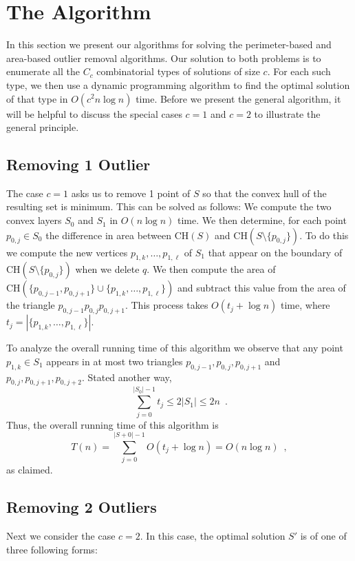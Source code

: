 \documentclass[lotsofwhite]{patmorin}
\newcommand{\ch}{\mathrm{CH}}
\begin{document}
\section{The Algorithm}

In this section we present our algorithms for solving the
perimeter-based and area-based outlier removal algorithms. Our
solution to both problems is to enumerate all the $C_c$ combinatorial
types of solutions of size $c$.  For each such type, we then use a
dynamic programming algorithm to find the optimal solution of that
type in $O(c^2 n\log n)$ time.  Before we present the general
algorithm, it will be helpful to discuss the special cases $c=1$ and
$c=2$ to illustrate the general principle.

\subsection{Removing 1 Outlier}

The case $c=1$ asks us to remove 1 point of $S$ so that the convex
hull of the resulting set is minimum.  This can be solved as follows:
We compute the two convex layers $S_0$ and $S_1$ in $O(n\log n)$ time.
We then determine, for each point $p_{0,j}\in S_0$ the difference in
area between $\ch(S)$ and $\ch(S\setminus\{p_{0,j}\})$.  To do this we
compute the new vertices $p_{1,k},\ldots,p_{1,\ell}$ of $S_1$ that
appear on the boundary of $\ch(S\setminus\{p_{0,j}\})$ when we delete
$q$.  We then compute the area of
$\ch(\{p_{0,j-1},p_{0,j+1}\}\cup\{p_{1,k},\ldots,p_{1,\ell}\})$ and
subtract this value from the area of the triangle
$p_{0,j-1}p_{0,j}p_{0,j+1}$.   This
process takes $O(t_j+\log n)$ time, where
$t_j=|\{p_{1,k},\ldots,p_{1,\ell}\}|$.

To analyze the overall running time of this algorithm we observe that
any point $p_{1,k}\in S_1$ appears in at most two triangles
$p_{0,j-1},p_{0,j},p_{0,j+1}$ and 
$p_{0,j},p_{0,j+1},p_{0,j+2}$.  Stated another way, 
\[  
     \sum_{j=0}^{|S_0|-1} t_j \le 2|S_1|\le 2n \enspace .
\]
Thus, the overall running time of this algorithm is 
\[
     T(n) = \sum_{j=0}^{|S+0|-1} O(t_j+\log n) = O(n\log n) \enspace ,
\]
as claimed.

\subsection{Removing 2 Outliers}

Next we consider the case $c=2$.  In this case, the optimal solution
$S'$ is of one of three following forms:
\end{document}
